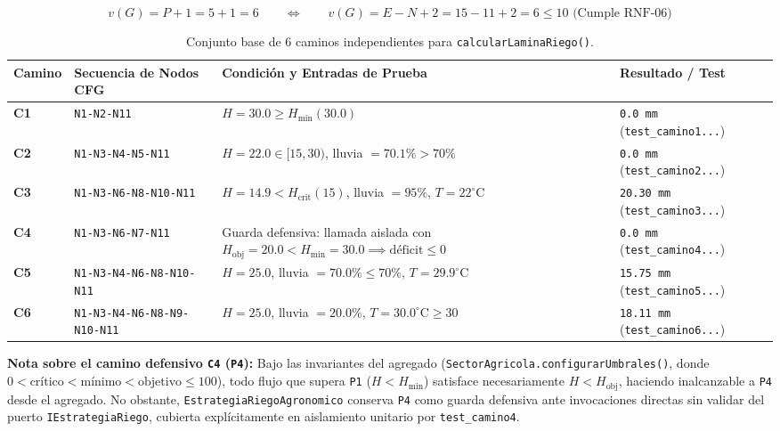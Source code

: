 \documentclass[11pt,letterpaper]{report}
\begin{document}
\[
v(G) = P + 1 = 5 + 1 = 6 \qquad\Longleftrightarrow\qquad v(G) = E - N + 2 = 15 - 11 + 2 = 6 \le 10 \text{ (Cumple RNF-06)}
\]

\begin{table}[H]
\centering
\caption{Conjunto base de 6 caminos independientes para \texttt{calcularLaminaRiego()}.}
\small
\begin{tabularx}{\textwidth}{l l Y l}
\toprule
\textbf{Camino} & \textbf{Secuencia de Nodos CFG} & \textbf{Condición y Entradas de Prueba} & \textbf{Resultado / Test} \\
\midrule
\textbf{C1} & \texttt{N1-N2-N11} & $H = 30.0 \ge H_{\min}(30.0)$ & \texttt{0.0 mm} (\texttt{test\_camino1...}) \\
\textbf{C2} & \texttt{N1-N3-N4-N5-N11} & $H = 22.0 \in [15, 30)$, lluvia $= 70.1\% > 70\%$ & \texttt{0.0 mm} (\texttt{test\_camino2...}) \\
\textbf{C3} & \texttt{N1-N3-N6-N8-N10-N11} & $H = 14.9 < H_{\text{crit}}(15)$, lluvia $= 95\%$, $T=22^{\circ}\text{C}$ & \texttt{20.30 mm} (\texttt{test\_camino3...}) \\
\textbf{C4} & \texttt{N1-N3-N6-N7-N11} & Guarda defensiva: llamada aislada con $H_{\text{obj}}=20.0 < H_{\min}=30.0 \implies \text{déficit} \le 0$ & \texttt{0.0 mm} (\texttt{test\_camino4...}) \\
\textbf{C5} & \texttt{N1-N3-N4-N6-N8-N10-N11} & $H = 25.0$, lluvia $= 70.0\% \le 70\%$, $T=29.9^{\circ}\text{C}$ & \texttt{15.75 mm} (\texttt{test\_camino5...}) \\
\textbf{C6} & \texttt{N1-N3-N4-N6-N8-N9-N10-N11} & $H = 25.0$, lluvia $= 20.0\%$, $T=30.0^{\circ}\text{C} \ge 30$ & \texttt{18.11 mm} (\texttt{test\_camino6...}) \\
\bottomrule
\end{tabularx}
\end{table}

\noindent\textbf{Nota sobre el camino defensivo \texttt{C4} (\texttt{P4}):} Bajo las invariantes del agregado (\texttt{SectorAgricola.\allowbreak configurarUmbrales()}, donde $0 < \text{crítico} < \text{mínimo} < \text{objetivo} \le 100$), todo flujo que supera \texttt{P1} ($H < H_{\min}$) satisface necesariamente $H < H_{\text{obj}}$, haciendo inalcanzable a \texttt{P4} desde el agregado. No obstante, \texttt{EstrategiaRiegoAgronomico} conserva \texttt{P4} como guarda defensiva ante invocaciones directas sin validar del puerto \texttt{IEstrategiaRiego}, cubierta explícitamente en aislamiento unitario por \texttt{test\_camino4}.
\end{document}

